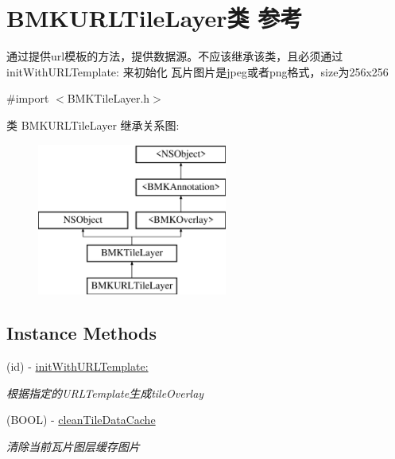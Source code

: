 \hypertarget{interface_b_m_k_u_r_l_tile_layer}{}\section{B\+M\+K\+U\+R\+L\+Tile\+Layer类 参考}
\label{interface_b_m_k_u_r_l_tile_layer}


通过提供url模板的方法，提供数据源。不应该继承该类，且必须通过 init\+With\+U\+R\+L\+Template\+: 来初始化 瓦片图片是jpeg或者png格式，size为256x256  




{\ttfamily \#import $<$B\+M\+K\+Tile\+Layer.\+h$>$}

类 B\+M\+K\+U\+R\+L\+Tile\+Layer 继承关系图\+:\begin{figure}[H]
\begin{center}
\leavevmode
\includegraphics[height=5.000000cm]{interface_b_m_k_u_r_l_tile_layer}
\end{center}
\end{figure}
\subsection*{Instance Methods}
\begin{DoxyCompactItemize}
\item 
(id) -\/ \hyperlink{interface_b_m_k_u_r_l_tile_layer_aff24eb2049f6b8027dd4c67b58abb80e}{init\+With\+U\+R\+L\+Template\+:}
\begin{DoxyCompactList}\small\item\em 根据指定的\+U\+R\+L\+Template生成tile\+Overlay \end{DoxyCompactList}\item 
\hypertarget{interface_b_m_k_u_r_l_tile_layer_a1c6f118ead416779e63872fab2fce71a}{}(B\+O\+O\+L) -\/ \hyperlink{interface_b_m_k_u_r_l_tile_layer_a1c6f118ead416779e63872fab2fce71a}{clean\+Tile\+Data\+Cache}\label{interface_b_m_k_u_r_l_tile_layer_a1c6f118ead416779e63872fab2fce71a}

\begin{DoxyCompactList}\small\item\em 清除当前瓦片图层缓存图片 \end{DoxyCompactList}\end{DoxyCompactItemize}
